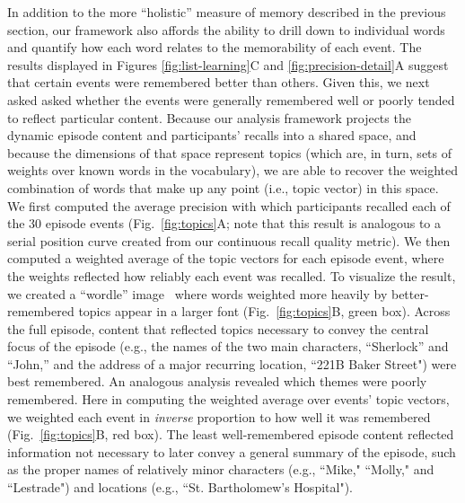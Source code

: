 \documentclass{article}
\begin{document}
In addition to the more ``holistic'' measure of memory described in the previous section, our framework also affords the ability to drill down to individual words and quantify how each word relates to the  memorability of each event. The results displayed in Figures \ref{fig:list-learning}C and \ref{fig:precision-detail}A suggest that certain events were remembered better than others.  Given this, we next asked asked whether the events were generally remembered well or poorly tended to reflect particular content.  Because our analysis framework projects the dynamic episode content and participants' recalls into a shared space, and because the dimensions of that space represent topics (which are, in turn, sets of weights over known words in the vocabulary), we are able to recover the weighted combination of words that make up any point (i.e., topic vector) in this space.  We first computed the average precision with which participants recalled each of the 30 episode events (Fig.~\ref{fig:topics}A; note that this result is analogous to a serial position curve created from our continuous recall quality metric).  We then computed a weighted average of the topic vectors for each episode event, where the weights reflected how reliably each event was recalled.  To visualize the result, we created a ``wordle'' image~\citep{MuelEtal18} where words weighted more heavily by better-remembered topics appear in a larger font (Fig.~\ref{fig:topics}B, green box).  Across the full episode, content that reflected topics necessary to convey the central focus of the episode (e.g., the names of the two main characters, ``Sherlock'' and ``John,'' and the address of a major recurring location, ``221B Baker Street") were best remembered.  An analogous analysis revealed which themes were poorly remembered.  Here in computing the weighted average over events' topic vectors, we weighted each event in \textit{inverse} proportion to how well it was remembered (Fig.~\ref{fig:topics}B, red box).  The least well-remembered episode content reflected information not necessary to later convey a general summary of the episode, such as the proper names of relatively minor characters (e.g., ``Mike," ``Molly," and ``Lestrade") and locations (e.g., ``St. Bartholomew's Hospital").
\end{document}
